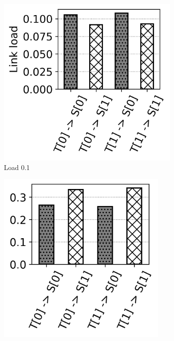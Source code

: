 \begin{figure}
	\centering
	\begin{subfigure}{.25\textwidth}
		\centering
		\includegraphics[width=0.99\textwidth]{Chapter4/Figures/opt_lb_lambda_01}
		\caption{Load 0.1}
	\end{subfigure}%
	\hfill
	\begin{subfigure}{.25\textwidth}
	\centering
	\includegraphics[width=0.92\textwidth]{Chapter4/Figures/opt_lb_lambda_03}

\end{subfigure}
\end{figure}

